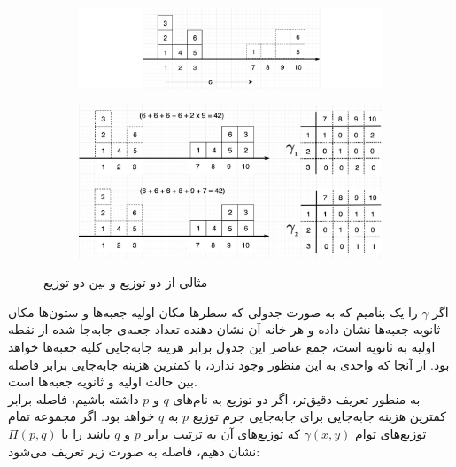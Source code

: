 \begin{figure}[h]
	\centering
	\begin{subfigure}[t]{.7\textwidth}
		\centering
		\includegraphics[width=1.\textwidth]{images/wasser2.png}
		\caption{}
		\label{fig:chap2:wasser1}
	\end{subfigure}

	\begin{subfigure}[t]{.6\textwidth}
		\centering
		\includegraphics[width=1.\textwidth]{images/wasser1.jpeg}
		\caption{}
		\label{fig:chap2:wasser2}
	\end{subfigure}
\caption{
    مثالی از دو توزیع  و 
    \transportplan{} 
    بین دو توزیع }
\end{figure}
اگر $\gamma$ را یک
بنامیم که به صورت جدولی که سطرها مکان اولیه جعبه‌ها و ستون‌ها مکان ثانویه جعبه‌ها نشان داده و هر خانه آن نشان دهنده تعداد جعبه‌ی جابه‌جا شده از نقطه اولیه به ثانویه است، جمع عناصر این جدول برابر هزینه جابه‌جایی کلیه جعبه‌ها خواهد بود. از آنجا که \transportplan{} واحدی به این منظور وجود ندارد، \transportplan{} با کمترین هزینه جابه‌جایی برابر فاصله \wasser{} بین حالت اولیه و ثانویه جعبه‌ها است.
\\
به منظور تعریف دقیق‌تر، اگر دو توزیع به نام‌های $q$ و $p$ داشته باشیم، فاصله \wasser{} برابر کمترین هزینه جابه‌جایی برای جابه‌جایی جرم توزیع $p$ به $q$ خواهد بود.
اگر مجموعه تمام توزیع‌های توام $\gamma(x,y)$ که توزیع‌های \marginal{} آن به ترتیب برابر $p$ و $q$ باشد را با $\Pi(p,q)$ نشان دهیم، فاصله \wasser{} به صورت زیر تعریف می‌شود:
